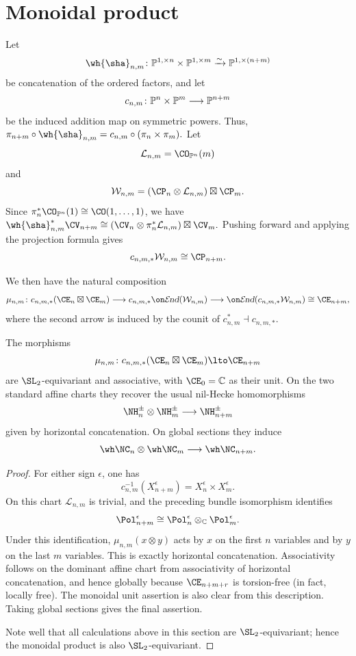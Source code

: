 \documentclass[11pt,reqno]{amsart}
\begin{document}
\section{Monoidal product}\label{sec:1color monoidal}
Let \[\wh{\sha}_{n,m}\colon \BP^{1,\times n}\times\BP^{1,\times m}\xrightarrow{\sim}\BP^{1,\times(n+m)}\]
be concatenation of the ordered factors, and let
\[c_{n,m}\colon\mathbb P^n\times\mathbb P^m\longrightarrow\mathbb P^{n+m}\]be the induced addition map on symmetric powers. Thus, $\pi_{n+m}\circ\wh{\sha}_{n,m}=c_{n,m}\circ(\pi_n\times\pi_m).$ Let
\[\mathcal L_{n,m}=\CO_{\BP^n}(m)\]and
\[\mathcal W_{n,m}=(\CP_n\otimes\mathcal L_{n,m})\boxtimes\CP_m.\]
Since $\pi_n^*\CO_{\BP^n}(1)\cong\CO(1,\ldots,1)$, we have $\wh{\sha}_{n,m}^*\CV_{n+m}\cong (\CV_n\otimes\pi_n^*\mathcal L_{n,m})\boxtimes\CV_m.$ Pushing forward and applying the projection formula gives \[c_{n,m,*}\mathcal W_{n,m}\cong\CP_{n+m}.\]

We then have the natural composition \[\mu_{n,m}\colon c_{n,m,*}(\CE_n\boxtimes\CE_m)\longrightarrow
c_{n,m,*}\shend(\mathcal W_{n,m})\longrightarrow\shend(c_{n,m,*}\mathcal W_{n,m})
\cong\CE_{n+m},\] where the second arrow is induced by the counit of $c_{n,m}^*\dashv c_{n,m,*}$.

\begin{theorem}\label{thm:A1-monoidal}
The morphisms
\[\mu_{n,m}\colon c_{n,m,*}(\CE_n\boxtimes \CE_m)\lto \CE_{n+m}\] 
are $\SL_2$-equivariant and associative, with $\CE_0=\BC$ as their
unit.  On the two standard affine charts they recover the usual
nil-Hecke homomorphisms
\[\NH_n^\pm\otimes\NH_m^\pm\longrightarrow\NH_{n+m}^\pm\]
given by horizontal concatenation.  On global sections they induce
\[\wh\NC_n\otimes\wh\NC_m\longrightarrow\wh\NC_{n+m}.\]
\end{theorem}

\begin{proof}
For either sign $\epsilon$, one has\[c_{n,m}^{-1}(X_{n+m}^\epsilon)=X_n^\epsilon\times X_m^\epsilon.\] On this chart $\mathcal L_{n,m}$ is trivial, and the preceding bundle
isomorphism identifies
\[\Pol_{n+m}^\epsilon\cong\Pol_n^\epsilon\otimes_{\BC}\Pol_m^\epsilon.\]
Under this identification, $\mu_{n,m}(x\otimes y)$ acts by $x$ on the
first $n$ variables and by $y$ on the last $m$ variables.  This is
exactly horizontal concatenation. Associativity follows on the dominant affine chart from associativity of horizontal concatenation, and hence globally because $\CE_{n+m+r}$ is torsion-free (in fact, locally free). The monoidal unit assertion is also clear from this description. Taking global sections gives the final assertion.

Note well that all calculations above in this section are $\SL_2$-equivariant; hence the monoidal product is also $\SL_2$-equivariant. 
\end{proof}
\end{document}
